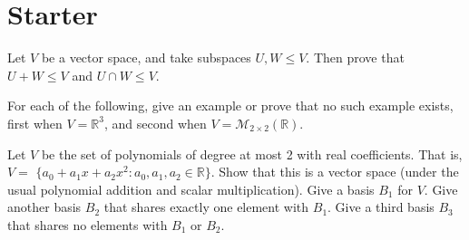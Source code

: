 \documentclass[answers]{exam}
\begin{document}
\section*{Starter}
\begin{questions}

\question%
Let $V$ be a vector space, and take subspaces $U, W \leqslant V$. Then prove that $U+W \leqslant V$ and $U \cap W \leqslant V$.



\question%
For each of the following, give an example or prove that no such example exists, first when $V=\mathbb{R}^{3}$, and second when $V=\mathcal{M}_{2 \times 2}(\mathbb{R})$.



\question%
Let $V$ be the set of polynomials of degree at most 2 with real coefficients. That is, $V=$ $\{a_{0}+a_{1} x+a_{2} x^{2}: a_{0}, a_{1}, a_{2} \in \mathbb{R}\}$. Show that this is a vector space (under the usual polynomial addition and scalar multiplication). Give a basis $B_{1}$ for $V$. Give another basis $B_{2}$ that shares exactly one element with $B_{1}$. Give a third basis $B_{3}$ that shares no elements with $B_{1}$ or $B_{2}$.

\end{questions}
\end{document}
